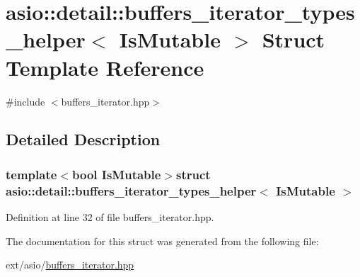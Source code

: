 \hypertarget{structasio_1_1detail_1_1buffers__iterator__types__helper}{}\section{asio\+:\+:detail\+:\+:buffers\+\_\+iterator\+\_\+types\+\_\+helper$<$ Is\+Mutable $>$ Struct Template Reference}
\label{structasio_1_1detail_1_1buffers__iterator__types__helper}


{\ttfamily \#include $<$buffers\+\_\+iterator.\+hpp$>$}



\subsection{Detailed Description}
\subsubsection*{template$<$bool Is\+Mutable$>$struct asio\+::detail\+::buffers\+\_\+iterator\+\_\+types\+\_\+helper$<$ Is\+Mutable $>$}



Definition at line 32 of file buffers\+\_\+iterator.\+hpp.



The documentation for this struct was generated from the following file\+:\begin{DoxyCompactItemize}
\item 
ext/asio/\hyperlink{buffers__iterator_8hpp}{buffers\+\_\+iterator.\+hpp}\end{DoxyCompactItemize}
